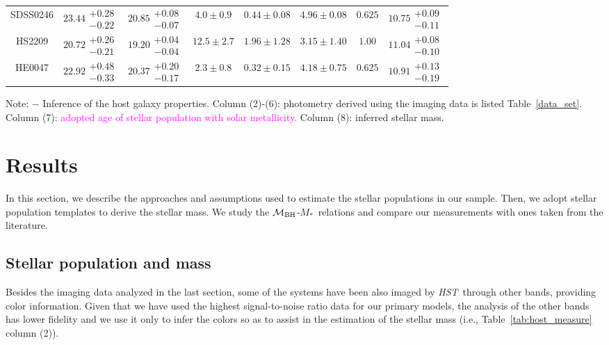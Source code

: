 \documentclass[fleqn,usenatbib]{mnras}
\newcommand{\hst}{{\it HST}}
\newcommand{\mbh}{$\mathcal M_{\rm BH}$}
\newcommand{\mstar}{{$M_*$}}
\newcommand{\pink}[1]{{\textcolor{magenta}{#1}}}
\begin{document}
\begin{table}
\begin{threeparttable}
\begin{tabular}{cccccccc}
SDSS0246 & $23.44\substack{+0.28\\-0.22}$ & $20.85\substack{+0.08\\-0.07}$ & $4.0\pm0.9$ & $0.44\pm0.08$ & $4.96\pm0.08$ & $0.625$ & $10.75\substack{+0.09\\-0.11}$ \\
HS2209 & $20.72\substack{+0.26\\-0.21}$ & $19.20\substack{+0.04\\-0.04}$ & $12.5\pm2.7$ & $1.96\pm1.28$ & $3.15\pm1.40$ & $1.00$ & $11.04\substack{+0.08\\-0.10}$ \\
HE0047 & $22.92\substack{+0.48\\-0.33}$ & $20.37\substack{+0.20\\-0.17}$ & $2.3\pm0.8$ & $0.32\pm0.15$ & $4.18\pm0.75$ & $0.625$ & $10.91\substack{+0.13\\-0.19}$ \\
\hline
\end{tabular}
\begin{tablenotes}
      \small
      \item Note: $-$ Inference of the host galaxy properties. Column (2)-(6): photometry derived using the imaging data is listed Table~\ref{data_set}. Column (7): \pink{adopted age of stellar population with solar metallicity.} Column (8): inferred stellar mass. 
\end{tablenotes}    
\end{threeparttable}
\end{table}


\section{Results}\label{sec:result}
In this section, we describe the approaches and assumptions used to estimate the stellar populations in our sample. Then, we adopt stellar population templates to derive the stellar mass. We study the \mbh-\mstar\ relations and compare our measurements with ones taken from the literature.

\subsection{Stellar population and mass}\label{sec:mstar}
Besides the imaging data analyzed in the last section, some of the systems have been also imaged by \hst\ through other bands, providing color information. Given that we have used the highest signal-to-noise ratio data for our primary models,  the analysis of the other bands has lower fidelity and we use it only to infer the colors so as to assist in the estimation of the stellar mass (i.e., Table~\ref{tab:host_measure} column (2)).
\end{document}
